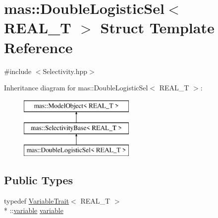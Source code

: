 \hypertarget{structmas_1_1_double_logistic_sel}{\section{mas\-:\-:Double\-Logistic\-Sel$<$ R\-E\-A\-L\-\_\-\-T $>$ Struct Template Reference}
\label{structmas_1_1_double_logistic_sel}
}


{\ttfamily \#include $<$Selectivity.\-hpp$>$}

Inheritance diagram for mas\-:\-:Double\-Logistic\-Sel$<$ R\-E\-A\-L\-\_\-\-T $>$\-:\begin{figure}[H]
\begin{center}
\leavevmode
\includegraphics[height=3.000000cm]{structmas_1_1_double_logistic_sel}
\end{center}
\end{figure}
\subsection*{Public Types}
\begin{DoxyCompactItemize}
\item 
typedef \hyperlink{structmas_1_1_variable_trait}{Variable\-Trait}$<$ R\-E\-A\-L\-\_\-\-T $>$\\*
\-::\hyperlink{structmas_1_1_double_logistic_sel_aa9c8db47e992fdddb25f535eb0d6b343}{variable} \hyperlink{structmas_1_1_double_logistic_sel_aa9c8db47e992fdddb25f535eb0d6b343}{variable}
\end{DoxyCompactItemize}
